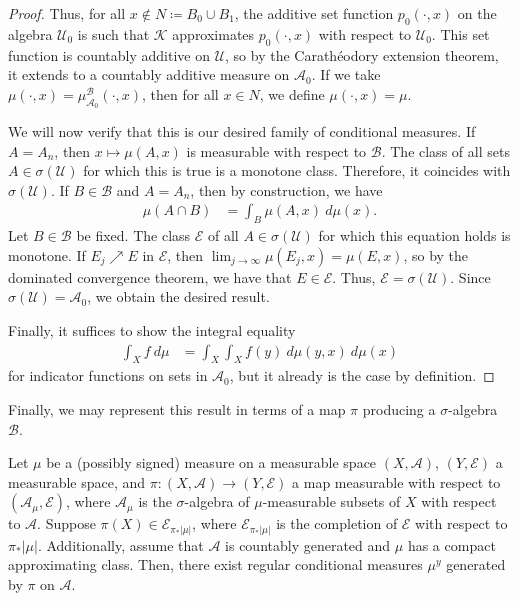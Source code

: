 \documentclass[10pt]{mypackage}
\renewcommand{\coloneq}{\coloneqq}
\begin{document}
\begin{proof}
  Thus, for all $x\notin N\coloneq B_0 \cup B_1$, the additive set function $p_0\left( \cdot,x \right)$ on the algebra $\mathcal{U}_0$ is such that $\mathcal{K}$ approximates $p_0\left( \cdot,x \right)$ with respect to $\mathcal{U}_0$. This set function is countably additive on $\mathcal{U}$, so by the Carathéodory extension theorem, it extends to a countably additive measure on $\mathcal{A}_0$. If we take $\mu\left( \cdot,x \right) = \mu^{\mathcal{B}}_{\mathcal{A}_0}\left( \cdot,x \right)$, then for all $x\in N$, we define $\mu\left( \cdot,x \right) = \mu$.

  We will now verify that this is our desired family of conditional measures. If $A = A_n$, then $x\mapsto \mu\left( A,x \right)$ is measurable with respect to $ \mathcal{B} $. The class of all sets $A\in \sigma\left( \mathcal{U} \right)$ for which this is true is a monotone class. Therefore, it coincides with $\sigma\left( \mathcal{U} \right)$. If $B\in \mathcal{B}$ and $A = A_n$, then by construction, we have
  \begin{align*}
    \mu\left( A\cap B \right) &= \int_{B}^{} \mu\left( A,x \right)\:d\mu(x).
  \end{align*}
  Let $B\in \mathcal{B}$ be fixed. The class $\mathcal{E}$ of all $A\in \sigma\left( \mathcal{U} \right)$ for which this equation holds is monotone. If $E_j\nearrow E$ in $\mathcal{E}$, then $\lim_{j\to\infty}\mu\left( E_j,x \right) = \mu\left( E,x \right)$, so by the dominated convergence theorem, we have that $E\in \mathcal{E}$. Thus, $\mathcal{E} = \sigma\left( \mathcal{U} \right)$. Since $\sigma\left( \mathcal{U} \right) = \mathcal{A}_0$, we obtain the desired result.

  Finally, it suffices to show the integral equality 
  \begin{align*}
    \int_{X}^{} f\:d\mu &= \int_{X}^{} \int_{X}^{} f(y)\:d\mu\left( y,x \right)\:d\mu(x)
  \end{align*}
  for indicator functions on sets in $ \mathcal{A}_0 $, but it already is the case by definition.
\end{proof}
Finally, we may represent this result in terms of a map $\pi$ producing a $\sigma$-algebra $\mathcal{B}$.
\begin{theorem}
  Let $\mu$ be a (possibly signed) measure on a measurable space $\left( X,\mathcal{A} \right)$, $\left( Y,\mathcal{E} \right)$ a measurable space, and $\pi\colon \left( X,\mathcal{A} \right)\to \left( Y,\mathcal{E} \right)$ a map measurable with respect to $\left( \mathcal{A}_{\mu},\mathcal{E} \right)$, where $\mathcal{A}_{\mu}$ is the $\sigma$-algebra of $\mu$-measurable subsets of $X$ with respect to $\mathcal{A}$. Suppose $\pi(X)\in \mathcal{E}_{\pi_{\ast}\left\vert \mu \right\vert}$, where $\mathcal{E}_{\pi_{\ast}\left\vert \mu \right\vert}$ is the completion of $\mathcal{E}$ with respect to $\pi_{\ast}\left\vert \mu \right\vert$. Additionally, assume that $\mathcal{A}$ is countably generated and $\mu$ has a compact approximating class. Then, there exist regular conditional measures $\mu^y$ generated by $\pi$ on $\mathcal{A}$.
\end{theorem}
\end{document}
